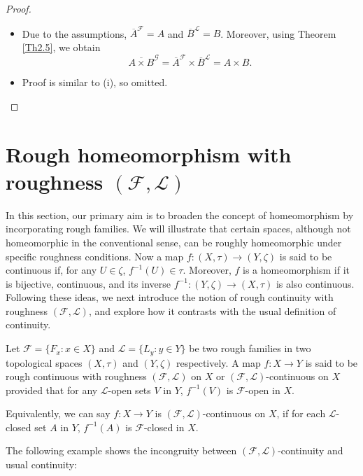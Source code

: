 \documentclass[11pt]{amsart}
\begin{document}
\begin{proof} \begin{itemize}
        \item[(i)]  Due to the assumptions, $\overline{A}^\mathscr{F}=A$ and $\overline{B}^\mathscr{L}=B$. Moreover, using Theorem \ref{Th2.5}, we obtain
$$\overline{A\times B}^\mathcal{G}=\overline{A}^\mathscr{F}\times \overline{B}^\mathscr{L}=A\times B.$$
 \item[(ii)] Proof is similar to (i), so omitted.
    \end{itemize}
\end{proof}




\section{ Rough homeomorphism with roughness $(\mathscr{F},\mathscr{L})$}\label{Sec3}
In this section, our primary aim is to broaden the concept of homeomorphism by incorporating rough families. We will illustrate that certain spaces, although not homeomorphic in the conventional sense, can be roughly homeomorphic under specific roughness conditions. Now a map \(f: (X,\tau)\to (Y,\zeta)\) is said to be continuous if, for any \(U\in \zeta\), \(f^{-1}(U)\in\tau\). Moreover, \(f\) is a homeomorphism if it is bijective, continuous, and its inverse \(f^{-1}: (Y,\zeta)\to (X,\tau)\) is also continuous. Following these ideas, we next introduce the notion of rough continuity with roughness $(\mathscr{F},\mathscr{L})$, and explore how it contrasts with the usual definition of continuity.


\begin{definition}
 Let $\mathscr{F}=\{F_x: x\in X\}$ and $\mathscr{L}=\{L_y: y\in Y\}$ be two rough families in two topological spaces \((X,\tau)\) and \((Y,\zeta)\) respectively. A map $f: X\rightarrow Y$ is  said to be rough continuous with roughness $(\mathscr{F},\mathscr{L})$ on $X$ or $(\mathscr{F},\mathscr{L})$-continuous on $X$ %
 provided that for any $\mathscr{L}$-open sets $V$ in $Y$,  $f^{-1}(V)$ is $\mathscr{F}$-open in $X$.

 Equivalently, we can say $f:X\to Y$ is  $(\mathscr{F},\mathscr{L})$-continuous on $X$, if for each $\mathscr{L}$-closed set $A$ in $Y$, $f^{-1}(A)$ is $\mathscr{F}$-closed in $X.$
\end{definition}

 The following example shows the incongruity between $(\mathscr{F},\mathscr{L})$-continuity and usual continuity:
\end{document}
